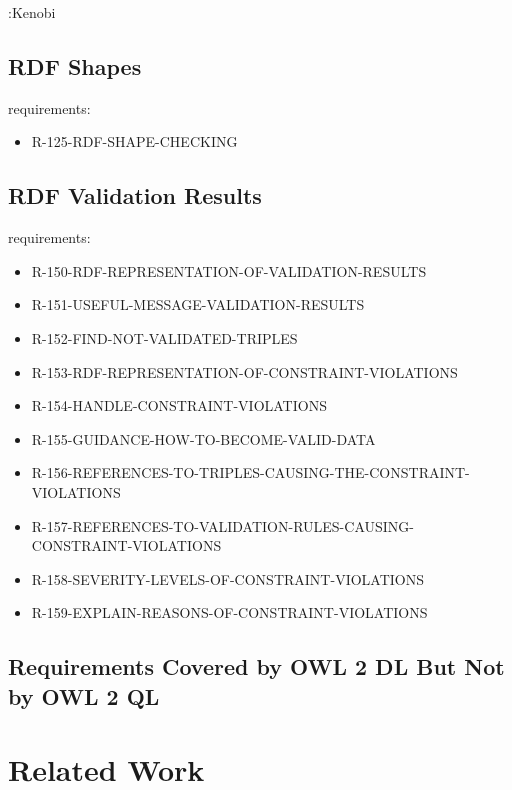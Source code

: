 \documentclass{llncs}
\begin{document}
\begin{ex}
:Kenobi
\end{ex}

\subsection{RDF Shapes}

requirements:

\begin{itemize}
	\item R-125-RDF-SHAPE-CHECKING
\end{itemize}

\subsection{RDF Validation Results}

requirements:

\begin{itemize}
	\item R-150-RDF-REPRESENTATION-OF-VALIDATION-RESULTS
	\item R-151-USEFUL-MESSAGE-VALIDATION-RESULTS
	\item R-152-FIND-NOT-VALIDATED-TRIPLES
	\item R-153-RDF-REPRESENTATION-OF-CONSTRAINT-VIOLATIONS
	\item R-154-HANDLE-CONSTRAINT-VIOLATIONS
	\item R-155-GUIDANCE-HOW-TO-BECOME-VALID-DATA
	\item R-156-REFERENCES-TO-TRIPLES-CAUSING-THE-CONSTRAINT-VIOLATIONS
	\item R-157-REFERENCES-TO-VALIDATION-RULES-CAUSING-CONSTRAINT-VIOLATIONS
	\item R-158-SEVERITY-LEVELS-OF-CONSTRAINT-VIOLATIONS
	\item R-159-EXPLAIN-REASONS-OF-CONSTRAINT-VIOLATIONS
\end{itemize}

\subsection{Requirements Covered by OWL 2 DL But Not by OWL 2 QL}



\section{Related Work}
\end{document}
